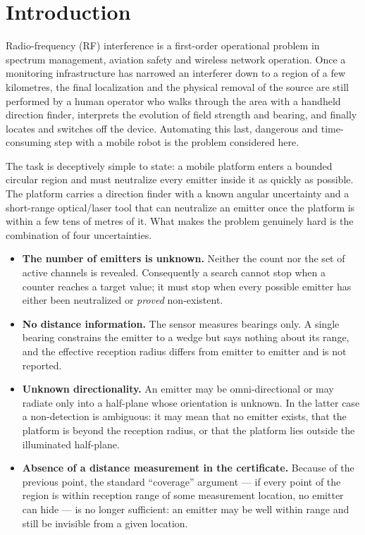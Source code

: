\documentclass[preprint,12pt,3p]{elsarticle}
\theoremstyle{definition}
\begin{document}
\section{Introduction}

Radio-frequency (RF) interference is a first-order operational problem in
spectrum management, aviation safety and wireless network operation. Once a monitoring
infrastructure has narrowed an interferer down to a region of a few kilometres, the final
localization and the physical removal of the source are still performed by a human operator who
walks through the area with a handheld direction finder, interprets the evolution of field
strength and bearing, and finally locates and switches off the device. Automating this last,
dangerous and time-consuming step with a mobile robot is the problem considered here.

The task is deceptively simple to state: a mobile platform enters a bounded circular region and
must neutralize every emitter inside it as quickly as possible. The platform carries a direction
finder with a known angular uncertainty and a short-range optical/laser tool that can neutralize
an emitter once the platform is within a few tens of metres of it. What makes the problem
genuinely hard is the combination of four uncertainties.

\begin{itemize}
\item \textbf{The number of emitters is unknown.} Neither the count nor the set of active
channels is revealed. Consequently a search cannot stop when a counter reaches a target value;
it must stop when every possible emitter has either been neutralized or \emph{proved}
non-existent.
\item \textbf{No distance information.} The sensor measures bearings only. A single bearing
constrains the emitter to a wedge but says nothing about its range, and the effective reception
radius differs from emitter to emitter and is not reported.
\item \textbf{Unknown directionality.} An emitter may be omni-directional or may radiate only
into a half-plane whose orientation is unknown. In the latter case a non-detection is ambiguous:
it may mean that no emitter exists, that the platform is beyond the reception radius, or that the
platform lies outside the illuminated half-plane.
\item \textbf{Absence of a distance measurement in the certificate.} Because of the previous
point, the standard ``coverage'' argument --- if every point of the region is within reception
range of some measurement location, no emitter can hide --- is no longer sufficient: an emitter
may be well within range and still be invisible from a given location.
\end{itemize}
\end{document}
